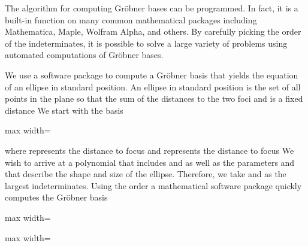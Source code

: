\documentclass[11pt,oneside]{article}
\begin{document}
\begin{BookBody}
The algorithm for computing Gröbner bases can be programmed. In fact, it is a built-in function on many common mathematical packages including Mathematica, Maple, Wolfram Alpha, and others. By carefully picking the order of the indeterminates, it is possible to solve a large variety of problems using automated computations of Gröbner bases.

 We use a software package to compute a Gröbner basis that yields the equation of an ellipse in standard position. An ellipse in standard position is the set of all points in the plane so that the sum of the distances to the two foci  and  is a fixed distance  We start with the basis

\begin{center}\begin{adjustbox}{max width=\linewidth}\end{adjustbox}\end{center}

\noindent where  represents the distance to focus  and  represents the distance to focus  We wish to arrive at a polynomial that includes  and  as well as the parameters  and  that describe the shape and size of the ellipse. Therefore, we take  and  as the largest indeterminates. Using the order  a mathematical software package quickly computes the Gröbner basis

\begin{center}\begin{adjustbox}{max width=\linewidth}\end{adjustbox}\end{center}

\begin{center}\begin{adjustbox}{max width=\linewidth}\end{adjustbox}\end{center}

\end{BookBody}
\end{document}
